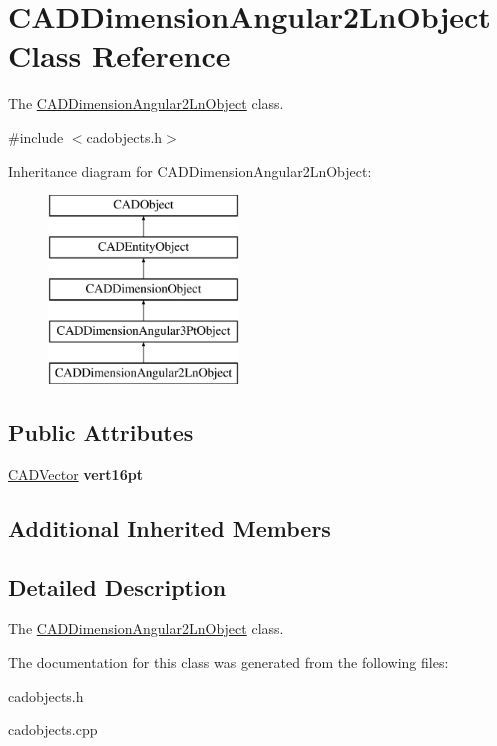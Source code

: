 \hypertarget{class_c_a_d_dimension_angular2_ln_object}{}\section{C\+A\+D\+Dimension\+Angular2\+Ln\+Object Class Reference}
\label{class_c_a_d_dimension_angular2_ln_object}


The \hyperlink{class_c_a_d_dimension_angular2_ln_object}{C\+A\+D\+Dimension\+Angular2\+Ln\+Object} class.  




{\ttfamily \#include $<$cadobjects.\+h$>$}

Inheritance diagram for C\+A\+D\+Dimension\+Angular2\+Ln\+Object\+:\begin{figure}[H]
\begin{center}
\leavevmode
\includegraphics[height=5.000000cm]{class_c_a_d_dimension_angular2_ln_object}
\end{center}
\end{figure}
\subsection*{Public Attributes}
\begin{DoxyCompactItemize}
\item 
\hyperlink{class_c_a_d_vector}{C\+A\+D\+Vector} {\bfseries vert16pt}\hypertarget{class_c_a_d_dimension_angular2_ln_object_a34e20b39eed39d22ad7ab874a4122be3}{}\label{class_c_a_d_dimension_angular2_ln_object_a34e20b39eed39d22ad7ab874a4122be3}

\end{DoxyCompactItemize}
\subsection*{Additional Inherited Members}


\subsection{Detailed Description}
The \hyperlink{class_c_a_d_dimension_angular2_ln_object}{C\+A\+D\+Dimension\+Angular2\+Ln\+Object} class. 

The documentation for this class was generated from the following files\+:\begin{DoxyCompactItemize}
\item 
cadobjects.\+h\item 
cadobjects.\+cpp\end{DoxyCompactItemize}

